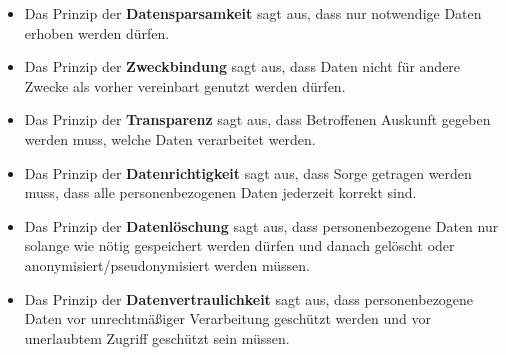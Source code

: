 \begin{itemize}
    \setlength\itemsep{-0.2em}
    \item Das Prinzip der \textbf{Datensparsamkeit} sagt aus, dass nur notwendige Daten erhoben werden dürfen.
    
    \item Das Prinzip der \textbf{Zweckbindung} sagt aus, dass Daten nicht für andere Zwecke als vorher
    vereinbart genutzt werden dürfen.
    
    \item Das Prinzip der \textbf{Transparenz} sagt aus, dass Betroffenen Auskunft gegeben werden muss,
    welche Daten verarbeitet werden.
    
    \item Das Prinzip der \textbf{Datenrichtigkeit} sagt aus, dass Sorge getragen werden muss,
    dass alle personenbezogenen Daten jederzeit korrekt sind.
    
    \item Das Prinzip der \textbf{Datenlöschung} sagt aus, dass personenbezogene Daten nur solange
    wie nötig gespeichert werden dürfen und danach gelöscht oder anonymisiert/pseudonymisiert
    werden müssen.
    
    \item Das Prinzip der \textbf{Datenvertraulichkeit} sagt aus, dass personenbezogene Daten
    vor unrechtmäßiger Verarbeitung geschützt werden und vor unerlaubtem
    Zugriff geschützt sein müssen.
\end{itemize}
